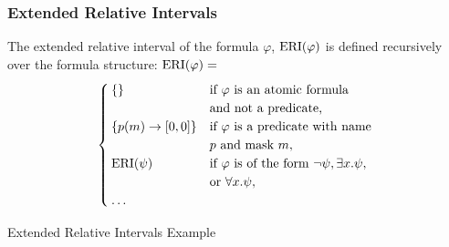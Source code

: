 \begin{frame}
    \frametitle{Extended Relative Intervals}
    \begin{definition}
        \label{def:e-rel-int}
        The extended relative interval of the formula $\varphi$, $\operatorname{ERI}(\varphi)$ is defined recursively over the formula structure:
        $\operatorname{ERI}(\varphi) =$
        \begin{equation*}
            \begin{cases}
                \{\} 
                    & \text{if } \varphi \text{ is an atomic formula} \\
                    & \text{and not a predicate,} \\ 
                \{p(m) \rightarrow [0,0]\} 
                    & \text{if } \varphi \text{ is a predicate with name } \\
                    & p \text{ and mask } m, \\
                \operatorname{ERI}(\psi) 
                    & \text{if } \varphi \text{ is of the form } \neg \psi, \exists x.\psi, \\
                    & \text{or } \forall x.\psi, \\
                \dots
            \end{cases}
        \end{equation*}
    \end{definition}
    
\end{frame}


\begin{frame}{Extended Relative Intervals Example}
    
\end{frame}
